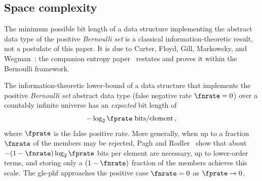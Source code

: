 \documentclass[ ../main.tex]{subfiles}
\begin{document}
\subsection{Space complexity}
The minimum possible bit length of a data structure implementing the abstract data type of the positive \emph{Bernoulli set} is a classical information-theoretic result, not a postulate of this paper. It is due to Carter, Floyd, Gill, Markowsky, and Wegman~\cite{carter1978}; the companion entropy paper~\cite{emaps} restates and proves it within the Bernoulli framework.
\begin{theorem}
\label{thm:approx_l_b}
The information-theoretic lower-bound of a data structure that implements the positive \emph{Bernoulli set} abstract data type (false negative rate $\fnrate = 0$) over a countably infinite universe has an \emph{expected} bit length of
\begin{equation}
    -\log_2 \fprate \; \si{bits \per element}\,,
\end{equation}
where $\fprate$ is the false positive rate. More generally, when up to a fraction $\fnrate$ of the members may be rejected, Pagh and Rodler~\cite[Prop.~1]{pagh2001lossy} show that about $-(1 - \fnrate)\log_2 \fprate$ bits per element are necessary, up to lower-order terms, and storing only a $(1-\fnrate)$ fraction of the members achieves this scale. The \gls{gls-phf} approaches the positive case $\fnrate = 0$ as $\fprate \to 0$.
\end{theorem}
\end{document}
